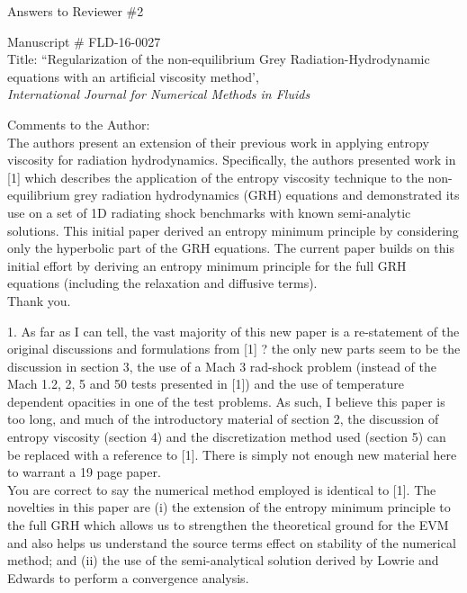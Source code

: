 \documentclass{article}
\begin{document}
\begin{center}
{ \Large Answers to Reviewer \#2}
\end{center}

\bigskip

\noindent Manuscript \# FLD-16-0027 \\
Title: ``Regularization of the non-equilibrium Grey Radiation-Hydrodynamic equations with an artificial viscosity method', \\
{\it International Journal for Numerical Methods in Fluids}\\

\bigskip
\bigskip

{\color{blue}
Comments to the Author: \\ 
The authors present an extension of their previous work in applying entropy viscosity for radiation hydrodynamics. Specifically, the authors presented work in [1] which describes the application of the entropy viscosity technique to the non-equilibrium grey radiation hydrodynamics (GRH) equations and demonstrated its use on a set of 1D radiating shock benchmarks with known semi-analytic solutions. This initial paper derived an entropy minimum principle by considering only the hyperbolic part of the GRH equations. The current paper builds on this initial effort by deriving an entropy minimum principle for the full GRH equations (including the relaxation and diffusive terms).\\}
Thank you.
\bigskip

{\color{blue}
1. As far as I can tell, the vast majority of this new paper is a re-statement of the original discussions and formulations from [1] ? the only new parts seem to be the discussion in section 3, the use of a Mach 3 rad-shock problem (instead of the Mach 1.2, 2, 5 and 50 tests presented in [1]) and the use of temperature dependent opacities in one of the test problems. As such, I believe this paper is too long, and much of the introductory material of section 2, the discussion of entropy viscosity (section 4) and the discretization method used (section 5) can be replaced with a reference to [1]. There is simply not enough new material here to warrant a 19 page paper. \\}
You are correct to say the numerical method employed is identical to [1]. The novelties in this paper are (i) the extension of the entropy minimum principle to the full GRH which allows us to strengthen the  theoretical ground for the EVM and also helps us understand the source terms effect on stability of the numerical method; and (ii) the use of the semi-analytical solution derived by Lowrie and Edwards to perform a convergence analysis.
\end{document}
